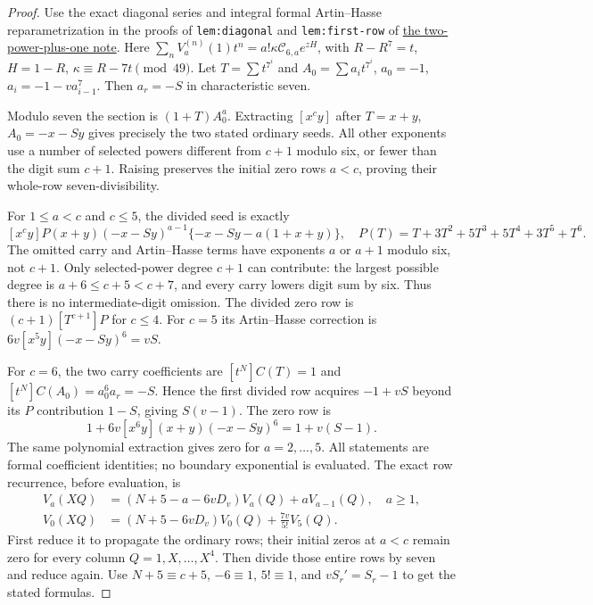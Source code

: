 \documentclass[11pt]{article}
\begin{document}
\begin{proof}
Use the exact diagonal series and integral formal Artin--Hasse
reparametrization in the proofs of \texttt{lem:diagonal} and
\texttt{lem:first-row} of
\href{GAP_SIX_TWO_POWER_PLUS_ONE_SFC.tex}
{the two-power-plus-one note}.
Here $\sum_nV_a^{(n)}(1)t^n=a!\kappa\mathcal C_{6,a}e^{zH}$,
with $R-R^7=t$, $H=1-R$, $\kappa\equiv R-7t\pmod{49}$.
Let $T=\sum t^{7^i}$ and $A_0=\sum a_it^{7^i}$,
$a_0=-1$, $a_i=-1-va_{i-1}^7$.
Then $a_r=-S$ in characteristic seven.

Modulo seven the section is $(1+T)A_0^a$.
Extracting $[x^cy]$ after $T=x+y$, $A_0=-x-Sy$ gives precisely
the two stated ordinary seeds.
All other exponents use a number of selected powers different
from $c+1$ modulo six, or fewer than the digit sum $c+1$.
Raising preserves the initial zero rows $a<c$, proving their
whole-row seven-divisibility.

For $1\le a<c$ and $c\le5$, the divided seed is exactly
\[
 [x^cy]P(x+y)(-x-Sy)^{a-1}
            \{-x-Sy-a(1+x+y)\},\quad
 P(T)=T+3T^2+5T^3+5T^4+3T^5+T^6.
\]
The omitted carry and Artin--Hasse terms have exponents
$a$ or $a+1$ modulo six, not $c+1$.
Only selected-power degree $c+1$ can contribute: the largest
possible degree is $a+6\le c+5<c+7$, and every carry lowers digit
sum by six. Thus there is no intermediate-digit omission.
The divided zero row is $(c+1)[T^{c+1}]P$ for $c\le4$.
For $c=5$ its Artin--Hasse correction is
$6v[x^5y](-x-Sy)^6=vS$.

For $c=6$, the two carry coefficients are
$[t^N]C(T)=1$ and $[t^N]C(A_0)=a_0^6a_r=-S$.
Hence the first divided row acquires $-1+vS$ beyond its
$P$ contribution $1-S$, giving $S(v-1)$.
The zero row is
\[
 1+6v[x^6y](x+y)(-x-Sy)^6=1+v(S-1).
\]
The same polynomial extraction gives zero for $a=2,\ldots,5$.
All statements are formal coefficient identities; no boundary
exponential is evaluated.
The exact row recurrence, before evaluation, is
\[
\begin{aligned}
 V_a(XQ)&=(N+5-a-6vD_v)V_a(Q)+aV_{a-1}(Q),\quad a\ge1,\\
 V_0(XQ)&=(N+5-6vD_v)V_0(Q)+\frac{7v}{5!}V_5(Q).
\end{aligned}
\]
First reduce it to propagate the ordinary rows; their initial zeros
at $a<c$ remain zero for every column $Q=1,X,\ldots,X^4$.
Then divide those entire rows by seven and reduce again.
Use $N+5\equiv c+5$, $-6\equiv1$, $5!\equiv1$, and
$vS_r'=S_r-1$ to get the stated formulas.
\end{proof}
\end{document}
